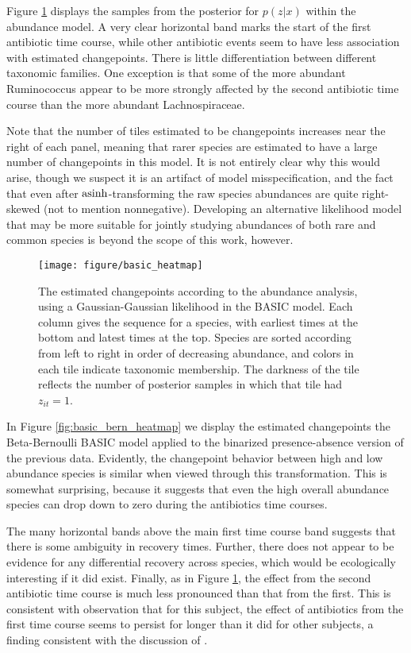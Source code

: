 \documentclass[14pt]{extreport}
\begin{document}
Figure \ref{fig:basic_heatmap} displays the samples from the posterior for
$p\left(z \vert x\right)$ within the abundance model. A very clear horizontal
band marks the start of the first antibiotic time course, while other antibiotic
events seem to have less association with estimated changepoints. There is
little differentiation between different taxonomic families. One exception is
that some of the more abundant Ruminococcus appear to be more strongly affected
by the second antibiotic time course than the more abundant Lachnospiraceae.

Note that the number of tiles estimated to be changepoints increases near the
right of each panel, meaning that rarer species are estimated to have a large
number of changepoints in this model. It is not entirely clear why this would
arise, though we suspect it is an artifact of model misspecification, and the
fact that even after $\mathop\mathrm{asinh}$-transforming the raw species abundances are quite
right-skewed (not to mention nonnegative). Developing an alternative likelihood
model that may be more suitable for jointly studying abundances of both rare and
common species is beyond the scope of this work, however.

\begin{figure}
  \centering
  \texttt{[image: figure/basic\_heatmap]}
  \caption{The estimated changepoints according to the abundance analysis, using
    a Gaussian-Gaussian likelihood in the BASIC model. Each column gives the
    sequence for a species, with earliest times at the bottom and latest times
    at the top. Species are sorted according from left to right in order of
    decreasing abundance, and colors in each tile indicate taxonomic membership.
    The darkness of the tile reflects the number of posterior samples in which
    that tile had $z_{it} = 1$.
    \label{fig:basic_heatmap} }
\end{figure}

In Figure \ref{fig:basic_bern_heatmap} we display the estimated changepoints the
Beta-Bernoulli BASIC model applied to the binarized presence-absence version of
the previous data. Evidently, the changepoint behavior between high and low
abundance species is similar when viewed through this transformation. This is
somewhat surprising, because it suggests that even the high overall abundance
species can drop down to zero during the antibiotics time courses.

The many horizontal bands above the main first time course band suggests that
there is some ambiguity in recovery times. Further, there does not appear to be
evidence for any differential recovery across species, which would be
ecologically interesting if it did exist. Finally, as in Figure
\ref{fig:basic_heatmap}, the effect from the second antibiotic time course is
much less pronounced than that from the first. This is consistent with
observation that for this subject, the effect of antibiotics from the first time
course seems to persist for longer than it did for other subjects, a finding
consistent with the discussion of \cite{dethlefsen2011incomplete}.
\end{document}
